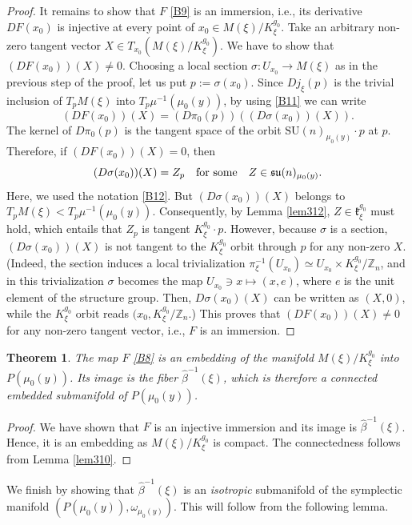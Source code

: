 \documentclass[a4paper,11pt,reqno]{amsart}
\newtheorem{thm}{Theorem}[section]
\theoremstyle{definition}
\numberwithin{equation}{section}
\newcommand{\be}{\begin{equation}}
\newcommand{\ee}{\end{equation}}
\def\bZ{{\mathbb Z}}                        %
\def\SU{\mathrm{SU}}                        %
\def\su{{\mathfrak{su}}}                    %
\def\k{{\mathfrak k}}                       %
\begin{document}
\begin{proof}
It remains to show
that $F$ \eqref{B9} is an immersion, i.e., its derivative $DF(x_0)$ is injective at every point of $x_0\in M(\xi)/K_\xi^{g_0}$.
 Take an arbitrary non-zero tangent vector $X\in T_{x_0} (M(\xi)/K_\xi^{g_0})$. We have to show  that
$(DF(x_0)) (X)\neq 0$.
Choosing a local section $\sigma: U_{x_0} \to M(\xi)$ as in the previous step of the proof,
let us put $p:= \sigma(x_0)$.  Since $D j_\xi(p)$ is the trivial inclusion of $T_p M(\xi)$ into $T_p \mu^{-1}(\mu_0(y))$, by using \eqref{B11}
we can write
\be
(DF(x_0))(X)  = (D\pi_0(p)) ( (D\sigma(x_0))(X)).
\ee
The kernel of $D\pi_0(p)$ is the tangent space of the orbit $\SU(n)_{\mu_0(y)}\cdot p$ at $p$.
Therefore,  if $(DF(x_0))(X)=0$, then
\be
(D\sigma(x_0))(X) = Z_p
\quad\hbox{for some} \quad
Z \in \su(n)_{\mu_0(y)}.
\ee
Here, we used the notation \eqref{B12}.
But $(D\sigma(x_0))(X)$ belongs to $T_p M(\xi) < T_p \mu^{-1}(\mu_0(y))$.  Consequently,  by Lemma \ref{lem312},  $Z\in \k_\xi^{g_0}$ must hold,
which entails that $Z_p$ is tangent $K_\xi^{g_0} \cdot p$.
However, because $\sigma$ is a section, $(D\sigma(x_0))(X)$ is not tangent to the
$K_\xi^{g_0}$ orbit through $p$ for any non-zero $X$.
(Indeed, the section induces a local trivialization
$\pi_\xi^{-1}(U_{x_0}) \simeq U_{x_0} \times K_\xi^{g_0}/\bZ_n$,
and in this trivialization $\sigma$ becomes the map $U_{x_0} \ni x \mapsto (x, e)$, where $e$ is the unit element of the structure group.
Then, $D\sigma(x_0)(X)$ can be written as $(X, 0)$, while the $K_\xi^{g_0}$ orbit reads $(x_0, K_\xi^{g_0}/\bZ_n$.)
This proves that $(DF(x_0))(X) \neq 0$ for any non-zero tangent vector, i.e., $F$ is an immersion.
 \end{proof}


\begin{thm}\label{thm314}
The map $F$ \eqref{B8} is an embedding of the manifold $M(\xi)/K_\xi^{g_0}$ into $P(\mu_0(y))$.
Its image is the fiber $\hat \beta^{-1}(\xi)$,  which is therefore a connected embedded submanifold of $P(\mu_0(y))$.
\end{thm}
\begin{proof}
We have shown that $F$ is an injective immersion and its image is $\hat \beta^{-1}(\xi)$.
Hence, it is an embedding as $M(\xi)/K_\xi^{g_0}$ is compact.
 The connectedness follows from Lemma \ref{lem310}.
\end{proof}


We finish by showing that $\hat \beta^{-1}(\xi)$ is an \emph{isotropic} submanifold
of the symplectic manifold $(P(\mu_0(y)), \omega_{\mu_0(y)})$.
This will follow from the following lemma.
\end{document}
